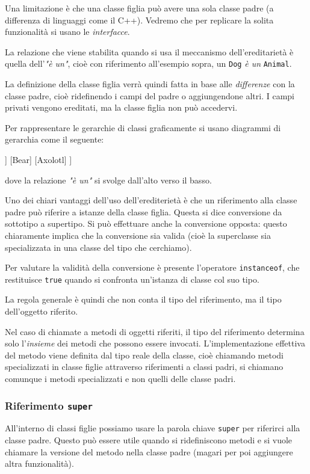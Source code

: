\documentclass[a4paper,11pt]{article}
\begin{document}
Una limitazione è che una classe figlia può avere una sola classe padre (a differenza di linguaggi come il C++). Vedremo che per replicare la solita funzionalità si usano le \textit{interfacce}.

La relazione che viene stabilita quando si usa il meccanismo dell'ereditarietà è quella dell'\textit{"è un"}, cioè con riferimento all'esempio sopra, un \lstinline|Dog| \textit{è un} \lstinline|Animal|.

La definizione della classe figlia verrà quindi fatta in base alle \textit{differenze} con la classe padre, cioè ridefinendo i campi del padre o aggiungendone altri.
I campi privati vengono ereditati, ma la classe figlia non può accedervi.

Per rappresentare le gerarchie di classi graficamente si usano diagrammi di gerarchia come il seguente:
\begin{center}
	\begin{forest}
		[Animal, rectstyle
			[Dog
				[Bulldog]
				[Chihuaha]
				[Hound]
			]
			[Bear]
			[Axolotl]
		]	
	\end{forest}
\end{center}
dove la relazione \textit{"è un"} si svolge dall'alto verso il basso.

Uno dei chiari vantaggi dell'uso dell'erediterietà è che un riferimento alla classe padre può riferire a istanze della classe figlia.
Questa si dice conversione da sottotipo a supertipo.
Si può effettuare anche la conversione opposta: questo chiaramente implica che la conversione sia valida (cioè la superclasse sia specializzata in una classe del tipo che cerchiamo).

Per valutare la validità della conversione è presente l'operatore \lstinline|instanceof|, che restituisce \lstinline|true| quando si confronta un'istanza di classe col suo tipo.

La regola generale è quindi che non conta il tipo del riferimento, ma il tipo dell'oggetto riferito.

Nel caso di chiamate a metodi di oggetti riferiti, il tipo del riferimento determina solo l'\textit{insieme} dei metodi che possono essere invocati.
L'implementazione effettiva del metodo viene definita dal tipo reale della classe, cioè chiamando metodi specializzati in classe figlie attraverso riferimenti a classi padri, si chiamano comunque i metodi specializzati e non quelli delle classe padri.

\subsubsection{Riferimento \lstinline|super|}
All'interno di classi figlie possiamo usare la parola chiave \lstinline|super| per riferirci alla classe padre.
Questo può essere utile quando si ridefiniscono metodi e si vuole chiamare la versione del metodo nella classe padre (magari per poi aggiungere altra funzionalità).
\end{document}
